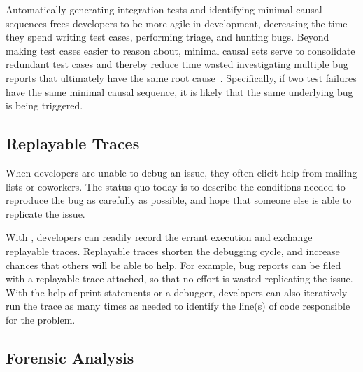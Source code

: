 Automatically generating integration tests and identifying
minimal causal sequences frees developers to be more agile in
development, decreasing the time they spend writing test cases,
performing triage, and
hunting bugs. Beyond making test cases easier to reason about, minimal causal
sets serve to consolidate redundant test cases and thereby reduce time wasted
investigating multiple bug reports that ultimately have the same root
cause~\cite{Zeller:2002:SIF:506201.506206}.
Specifically, if two test failures have the same minimal causal sequence, it is
likely that the same underlying bug is being triggered.

\subsection{Replayable Traces}

When developers are unable to debug an issue, they often elicit help from
mailing lists or coworkers. The status quo today is to describe the conditions needed to
reproduce the bug as carefully as possible, and hope that someone else is able
to replicate the issue.

With \projectname, developers can readily record the errant execution and
exchange replayable traces.
Replayable traces shorten the debugging cycle, and increase chances that others
will be able to help. For example, bug reports can be filed with a replayable trace
attached, so that no
effort is wasted replicating the issue. With the help of print statements or a
debugger, developers can also iteratively run the trace as many times as
needed to identify the line(s) of code responsible for the problem.

\subsection{Forensic Analysis}

